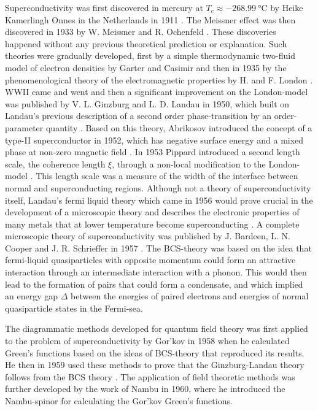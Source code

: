 Superconductivity was first discovered in mercury at $T_c\approx\SI{-268.99}{\degreeCelsius}$ by Heike Kamerlingh Onnes in the Netherlands in 1911 \cite{Onnes}.
The Meissner effect was then discovered in 1933 by W. Meissner and R. Ochenfeld \cite{Meissner33}. These discoveries happened without any previous
theoretical prediction or explanation. Such theories were gradually developed, first by a simple thermodynamic two-fluid model of electron densities
by Garter and Casimir and then in 1935 by the phenomenological theory of the electromagnetic properties by H. and F. London \cite{London35}. WWII
came and went and then a significant improvement on the London-model was published by V. L. Ginzburg and L. D. Landau in 1950, which built on Landau's
previous description of a second order phase-transition by an order-parameter quantity \cite{Ginzburg50}. Based on this theory, Abrikosov introduced
the concept of a type-II superconductor in 1952, which has negative surface energy and a mixed phase at non-zero magnetic field \cite{Abrikosov52}.
In 1953 Pippard introduced a second length scale, the coherence length $\xi$, through a non-local modification to the London-model \cite{Pippard53}.
This length scale was a measure of the width of the interface between normal and superconducting regions. Although not a theory of superconductivity
itself, Landau's fermi liquid theory which came in 1956 would prove crucial in the development of a microscopic theory and describes the electronic
properties of many metals that at lower temperature become superconducting \cite{Landau56}. A complete microscopic theory of superconductivity was
published by J. Bardeen, L. N. Cooper and J. R. Schrieffer in 1957 \cite{Bardeen57}. The BCS-theory was based on the idea that fermi-liquid
quasiparticles with opposite momentum could form an attractive interaction through an intermediate interaction with a phonon. This would then lead
to the formation of pairs that could form a condensate, and which implied an energy gap $\Delta$ between the energies of paired electrons
and energies of normal quasiparticle states in the Fermi-sea. 

The diagrammatic methods developed for quantum field theory was first applied to the
problem of superconductivity by Gor'kov in 1958 \cite{Gorkov58} when he calculated Green's functions based on the ideas of BCS-theory that reproduced
its results. He then in 1959 used these methods to prove that the Ginzburg-Landau theory follows from the BCS theory \cite{Gorkov59}.
The application of field theoretic methods was further developed by the work of Nambu in 1960, where he introduced the Nambu-spinor for calculating the
Gor'kov Green's functions.

